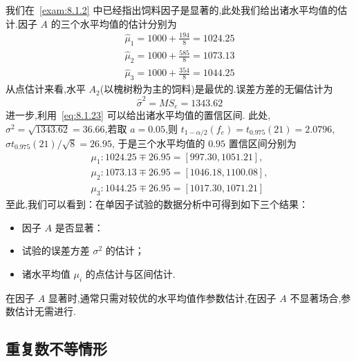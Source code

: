 \begin{example}
我们在~\ref{exam:8.1.2} 中已经指出饲料因子是显著的,此处我们给出诸水平均值的估计.因子 $A$ 的三个水平均值的估计分别为
  \begin{gather*} \hat{\mu}_{1} =1000+\frac{194}{8}=1024.25 \\ 
    \hat{\mu}_{2} =1000+\frac{585}{8}=1073.13 \\ 
    \hat{\mu}_{3} =1000+\frac{354}{8}=1044.25 
  \end{gather*}
从点估计来看,水平 $A_2$(以槐树粉为主的饲料)是最优的.误差方差的无偏估计为
\begin{equation*}
  \hat{\sigma}^{2}=M S_{e}=1343.62
\end{equation*}
进一步,利用~\ref{eq:8.1.23} 可以给出诸水平均值的置信区间. 此处,$\sigma^2=\sqrt{1343.62}=
36.66$,若取 $a=0.05$,则 $t_{1-\alpha/2} (f_e)=t_{0.975}(21)=2.0796$, $\hat{\sigma} t_{0.975}(21)/\sqrt{8}=26.95$, 于是三个水平均值的 $0.95$ 置信区间分别为
\begin{gather*}
  \mu_{1} : 1024.25 \mp 26.95 = [997.30, 1051.21],\\
  \mu_{2} : 1073.13 \mp 26.95=[1046.18,1100.08],\\
  \mu_{3} : 1044.25 \mp 26.95=[1017.30,1071.21]
\end{gather*}
至此,我们可以看到：在单因子试验的数据分析中可得到如下三个结果：
\begin{itemize}
  \item 因子 $A$ 是否显著：
  \item 试验的误差方差 $\sigma^2$ 的估计；
  \item 诸水平均值 $\mu_i$ 的点估计与区间估计.
\end{itemize}

在因子 $A$ 显著时,通常只需对较优的水平均值作参数估计,在因子 $A$ 不显著场合,参数估计无需进行.
\end{example}
\subsection{重复数不等情形}


